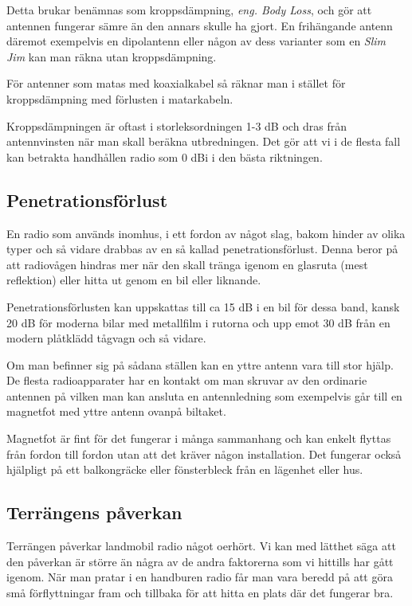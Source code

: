 Detta brukar benämnas som kroppsdämpning, \textit{eng. Body Loss}, och gör att antennen fungerar sämre än den annars skulle ha gjort. En frihängande antenn däremot exempelvis en dipolantenn eller någon av dess varianter som en \textit{Slim Jim} kan man räkna utan kroppsdämpning.

För antenner som matas med koaxialkabel så räknar man i stället för kroppsdämpning med förlusten i matarkabeln. 

Kroppsdämpningen är oftast i storleksordningen 1-3 dB och dras från antennvinsten när man skall beräkna utbredningen. Det gör att vi i de flesta fall kan betrakta handhållen radio som 0 dBi i den bästa riktningen.

\subsection{Penetrationsförlust}

En radio som används inomhus, i ett fordon av något slag, bakom hinder av olika typer och så vidare drabbas av en så kallad penetrationsförlust. Denna beror på att radiovågen hindras mer när den skall tränga igenom en glasruta (mest reflektion) eller hitta ut genom en bil eller liknande. 

Penetrationsförlusten kan uppskattas till ca 15 dB i en bil för dessa band, kansk 20 dB för moderna bilar med metallfilm i rutorna och upp emot 30 dB från en modern plåtklädd tågvagn och så vidare.

Om man befinner sig på sådana ställen kan en yttre antenn vara till stor hjälp. De flesta radioapparater har en kontakt om man skruvar av den ordinarie antennen på vilken man kan ansluta en antennledning som exempelvis går till en magnetfot med yttre antenn ovanpå biltaket.

Magnetfot är fint för det fungerar i många sammanhang och kan enkelt flyttas från fordon till fordon utan att det kräver någon installation. Det fungerar också hjälpligt på ett balkongräcke eller fönsterbleck från en lägenhet eller hus.


\subsection{Terrängens påverkan}

Terrängen påverkar landmobil radio något oerhört. Vi kan med lätthet säga att den påverkan är större än några av de andra faktorerna som vi hittills har gått igenom. När man pratar i en handburen radio får man vara beredd på att göra små förflyttningar fram och tillbaka för att hitta en plats där det fungerar bra.

